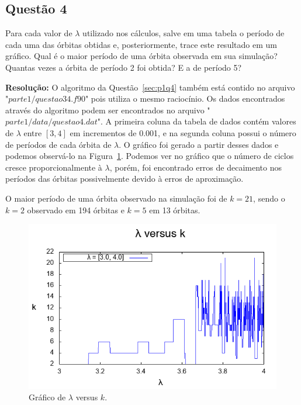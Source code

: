 \documentclass[12pt]{article}
\begin{document}
\subsection*{Questão 4}
\label{sec:p1q4}
Para cada valor de $\lambda$ utilizado nos cálculos, salve em uma tabela o período de cada uma das órbitas obtidas e, posteriormente, trace este resultado em um gráfico. Qual é o maior período de uma órbita observada em sua simulação? Quantas vezes a órbita de período 2 foi obtida? E a de período 5?

\textbf{Resolução:}
O algoritmo da Questão~\ref{sec:p1q4} também está contido no arquivo "$\textit{parte1/questao34.f90}$" pois utiliza o mesmo raciocínio. Os dados encontrados através do algoritmo podem ser encontrados no arquivo "$\textit{parte1/data/questao4.dat}$". A primeira coluna da tabela de dados contém valores de $\lambda$ entre $[3, 4]$ em incrementos de 0.001, e na segunda coluna possui o número de períodos de cada órbita de $\lambda$. O gráfico foi gerado a partir desses dados e podemos observá-lo na Figura~\ref{fig:p1q4}. Podemos ver no gráfico que o número de ciclos cresce proporcionalmente à $\lambda$, porém, foi encontrado erros de decaimento nos períodos das órbitas possivelmente devido à erros de aproximação.

O maior período de uma órbita observado na simulação foi de $k = 21$, sendo o $k = 2$ observado em 194 órbitas e $k = 5$ em 13 órbitas.

\begin{figure}[H]
	\centering
	\includegraphics[width=1\textwidth]{p1q4.png}
	\caption{Gráfico de $\lambda$ versus $k$.}
	\label{fig:p1q4}
\end{figure}
\end{document}
